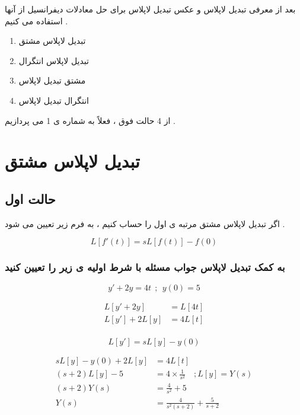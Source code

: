\documentclass[12pt]{book}
\begin{document}
بعد از معرفی تبدیل لاپلاس و عکس تبدیل لاپلاس برای حل معادلات دیفرانسیل از آنها استفاده می کنیم .

\begin{enumerate}
	\item تبدیل لاپلاس مشتق
	\item تبدیل لاپلاس انتگرال
	\item مشتق تبدیل لاپلاس
	\item انتگرال تبدیل لاپلاس
\end{enumerate}

از 4 حالت فوق ، فعلاً به شماره ی 1 می پردازیم .


\section{تبدیل لاپلاس مشتق}

\subsection{حالت اول}
اگر تبدیل لاپلاس مشتق مرتبه ی اول را حساب کنیم ، به فرم زیر تعیین می شود .

\begin{tcolorbox}
$$
L \left[ f'(t) \right] = s L\left[ f(t) \right] - f(0)
$$
\end{tcolorbox}


\subsubsection{
به کمک تبدیل لاپلاس جواب مسئله با شرط اولیه ی زیر را تعیین کنید
}

$$
y' + 2y = 4t \:\: ;  \:\: y(0) = 5
$$


\begin{align*}
L \left[ y' + 2y \right] &= L \left[ 4t \right] \\
L \left[ y' \right] + 2 L \left[ y \right] &= 4 L \left[ t \right] \\
\end{align*}

\begin{tcolorbox}
$$
L[y'] = sL[y] - y(0)
$$
\end{tcolorbox}

\begin{align*}
sL[y] - y(0) + 2L[y] &= 4L[t] \\
(s+2) L [y] - 5 &= 4 \times \frac{1}{s^{2}} \quad ; L[y] = Y(s) \\
(s+2) Y(s) &= \frac{4}{s^{2}} + 5 \\
Y(s) &= \frac{4}{s^{2}(s+2)} + \frac{5}{s+2}
\end{align*}
\end{document}
